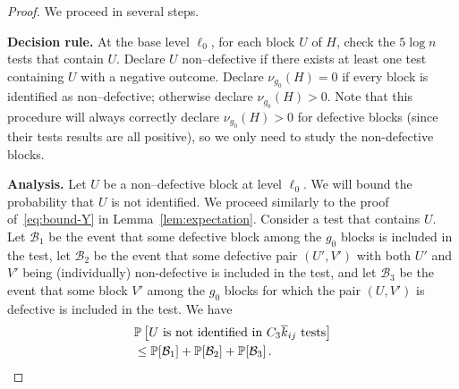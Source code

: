 \documentclass[journal]{IEEEtran}
\theoremstyle{definition}
\theoremstyle{definition}
\newcommand{\Bc}{\mathcal{B}}
\newcommand{\PP}{\mathbb{P}}
\newcommand{\PV}{\nu}
\newcommand{\kb}{\overline{k}}
\newcommand{\bigO}{\mathcal{O}}
\begin{document}
\begin{proof}


We proceed in several steps.

\textbf{Decision rule.}
At the base level \(\ell_0\), for each block \(U\) of \(H\), check the \(5\log n\) tests that contain \(U\).
Declare \(U\) non–defective if there exists at least one test containing \(U\) with a negative outcome.
Declare \(\PV_{g_0}(H)=0\) if every block is identified as non–defective; otherwise declare \(\PV_{g_0}(H)>0\).  Note that this procedure will always correctly declare $\PV_{g_0}(H)>0$ for defective blocks (since their tests results are all positive), so we only need to study the non-defective blocks.

\textbf{Analysis.}
Let \(U\) be a non–defective block at level \(\ell_0\).  
We will bound the probability that \(U\) is not identified. We proceed similarly to the proof of~\eqref{eq:bound-Y} in Lemma~\ref{lem:expectation}.
Consider a test that contains \(U\).
Let $\Bc_1$ be the event that some defective block among the $g_0$ blocks is included in the test, 
let $\Bc_2$ be the event that some defective pair $(U',V')$ with both $U'$ and $V'$ being (individually) non\mbox{-}defective is included in the test, 
and let $\Bc_3$ be the event that some block $V'$ among the $g_0$ blocks for which the pair $(U,V')$ is defective is included in the test. We have %
\begin{align}
    &\PP \left[ U \text{ is not identified in } 
       C_3\kb_{ij} \text{ tests} \right] \notag \\
    &\le\PP[\Bc_1] + \PP[\Bc_2] + \PP[\Bc_3]\, .
    \label{eq:U_block_not_identified}
\end{align}


\end{proof}
\end{document}
